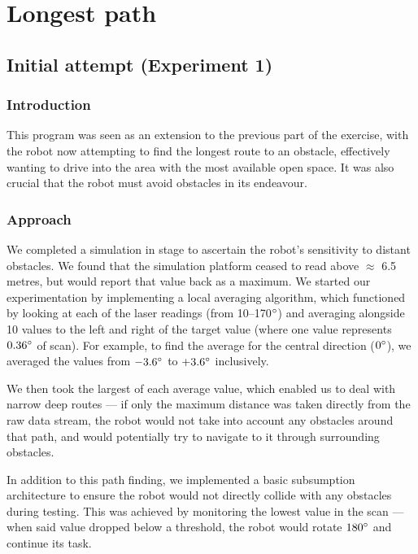 \documentclass[twocolumn,11pt]{article}
\begin{document}
\section{Longest path}
\subsection{Initial attempt (Experiment 1)}
\subsubsection{Introduction}

This program was seen as an extension to the previous part of the exercise, with the robot now attempting to find the longest route to an obstacle, effectively wanting to drive into the area with the most available open space. It was also crucial that the robot must avoid obstacles in its endeavour.

\subsubsection{Approach}

We completed a simulation in \textsf{stage} to ascertain the robot's sensitivity to distant obstacles. We found that the simulation platform ceased to read above $\approx$ 6.5 metres, but would report that value back as a maximum. We started our experimentation by implementing a local averaging algorithm, which functioned by looking at each of the laser readings (from 10--170$\degree$) and averaging alongside 10 values to the left and right of the target value (where one value represents $0.36\degree$ of scan). For example, to find the average for the central direction ($0\degree$), we averaged the values from $-3.6\degree$ to $+3.6\degree$ inclusively. 

We then took the largest of each average value, which enabled us to deal with narrow deep routes --- if only the maximum distance was taken directly from the raw data stream, the robot would not take into account any obstacles around that path, and would potentially try to navigate to it through surrounding obstacles.

In addition to this path finding, we implemented a basic subsumption architecture to ensure the robot would not directly collide with any obstacles during testing. This was achieved by monitoring the lowest value in the scan --- when said value dropped below a threshold, the robot would rotate $180\degree$ and continue its task.
\end{document}
